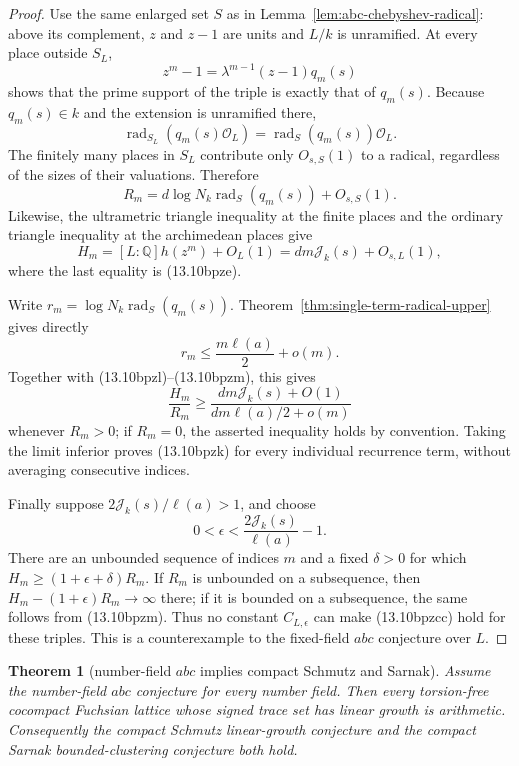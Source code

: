 \documentclass[11pt,reqno]{amsart}
\newtheorem{theorem}{Theorem}[section]
\theoremstyle{definition}
\theoremstyle{remark}
\newcommand{\Q}{\mathbb Q}
\newcommand{\cO}{\mathcal O}
\begin{document}
\begin{proof}
Use the same enlarged set \(S\) as in
Lemma~\ref{lem:abc-chebyshev-radical}: above its complement, \(z\) and
\(z-1\) are units and \(L/k\) is unramified.  At every place outside
\(S_L\),
\[
 z^m-1=\lambda^{m-1}(z-1)q_m(s)
\]
shows that the prime support of the triple is exactly that of \(q_m(s)\).
Because \(q_m(s)\in k\) and the extension is unramified there,
\[
 \operatorname{rad}_{S_L}(q_m(s)\cO_L)
 =\operatorname{rad}_{S}(q_m(s))\cO_L.
\]
The finitely many places in \(S_L\) contribute only \(O_{s,S}(1)\) to a
radical, regardless of the sizes of their valuations.  Therefore
\[
 R_m=d\log N_k\operatorname{rad}_{S}(q_m(s))+O_{s,S}(1).
\tag{13.10bpzl}
\]
Likewise, the ultrametric triangle inequality at the finite places and
the ordinary triangle inequality at the archimedean places give
\[
 H_m=[L:\Q]h(z^m)+O_L(1)
     =dm\mathcal J_k(s)+O_{s,L}(1),
\tag{13.10bpzm}
\]
where the last equality is (13.10bpze).

Write
\(r_m=\log N_k\operatorname{rad}_{S}(q_m(s))\).
Theorem~\ref{thm:single-term-radical-upper} gives directly
\[
 r_m\le\frac{m\ell(a)}2+o(m).
\tag{13.10bpzn}
\]
Together with (13.10bpzl)--(13.10bpzm), this gives
\[
 \frac{H_m}{R_m}
 \ge
 \frac{dm\mathcal J_k(s)+O(1)}
      {dm\ell(a)/2+o(m)}
\]
whenever \(R_m>0\); if \(R_m=0\), the asserted inequality holds by
convention.  Taking the limit inferior proves (13.10bpzk) for every
individual recurrence term, without averaging consecutive indices.

Finally suppose \(2\mathcal J_k(s)/\ell(a)>1\), and choose
\[
 0<\epsilon<\frac{2\mathcal J_k(s)}{\ell(a)}-1.
\]
There are an unbounded sequence of indices \(m\) and a fixed \(\delta>0\)
for which
\(H_m\ge(1+\epsilon+\delta)R_m\).  If \(R_m\) is unbounded on a
subsequence, then \(H_m-(1+\epsilon)R_m\to\infty\) there; if it is
bounded on a subsequence, the same follows from (13.10bpzm).  Thus no
constant \(C_{L,\epsilon}\) can make (13.10bpzcc) hold for these triples.
This is a counterexample to the fixed-field \(abc\) conjecture over \(L\).
\end{proof}

\begin{theorem}[number-field \(abc\) implies compact Schmutz and Sarnak]
\label{thm:abc-implies-compact}
Assume the number-field \(abc\) conjecture for every number field.  Then
every torsion-free cocompact Fuchsian lattice whose signed trace set has
linear growth is arithmetic.  Consequently the compact Schmutz
linear-growth conjecture and the compact Sarnak bounded-clustering
conjecture both hold.
\end{theorem}
\end{document}
